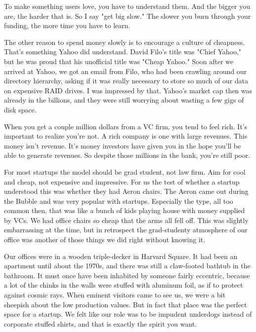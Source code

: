To make something
                    users love, you have to understand them. And the bigger you
                    are, the harder that is. So I say "get big slow." The slower
                    you burn through your funding, the more time you have to
                    learn.

The other reason to spend money slowly is
                    to encourage a culture of cheapness. That's something Yahoo
                    did understand. David Filo's title was "Chief Yahoo," but he
                    was proud that his unofficial title was "Cheap Yahoo." Soon
                    after we arrived at Yahoo, we got an email from Filo, who
                    had been crawling around our directory hierarchy, asking if
                    it was really necessary to store so much of our data on
                    expensive RAID drives. I was impressed by that. Yahoo's
                    market cap then was already in the billions, and they were
                    still worrying about wasting a few gigs of disk space.

When
                    you get a couple million dollars from a VC firm, you tend to
                    feel rich. It's important to realize you're not. A rich
                    company is one with large revenues. This money isn't
                    revenue. It's money investors have given you in the hope
                    you'll be able to generate revenues. So despite those
                    millions in the bank, you're still poor.

For most
                    startups the model should be grad student, not law firm. Aim
                    for cool and cheap, not expensive and impressive. For us the
                    test of whether a startup understood this was whether they
                    had Aeron chairs. The Aeron came out during the Bubble and
                    was very popular with startups. Especially the type, all too
                    common then, that was like a bunch of kids playing house
                    with money supplied by VCs. We had office chairs so cheap
                    that the arms all fell off. This was slightly embarrassing
                    at the time, but in retrospect the grad-studenty atmosphere
                    of our office was another of those things we did right
                    without knowing it.

Our offices were in a wooden
                    triple-decker in Harvard Square. It had been an apartment
                    until about the 1970s, and there was still a claw-footed
                    bathtub in the bathroom. It must once have been inhabited by
                    someone fairly eccentric, because a lot of the chinks in the
                    walls were stuffed with aluminum foil, as if to protect
                    against cosmic rays. When eminent visitors came to see us,
                    we were a bit sheepish about the low production values. But
                    in fact that place was the perfect space for a startup. We
                    felt like our role was to be impudent underdogs instead of
                    corporate stuffed shirts, and that is exactly the spirit you
                    want.

